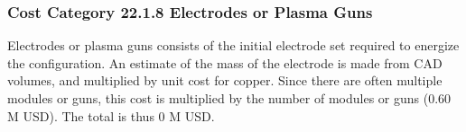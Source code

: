 \subsubsection*{Cost Category 22.1.8 Electrodes or Plasma Guns}

Electrodes or plasma guns consists of the initial electrode set required to energize the configuration. An estimate of the mass of the electrode is made from CAD volumes, and multiplied by unit
cost for copper. Since there are often multiple modules or guns, this cost is multiplied by the number of modules or guns (0.60 M USD). The total is thus 0 M USD.

